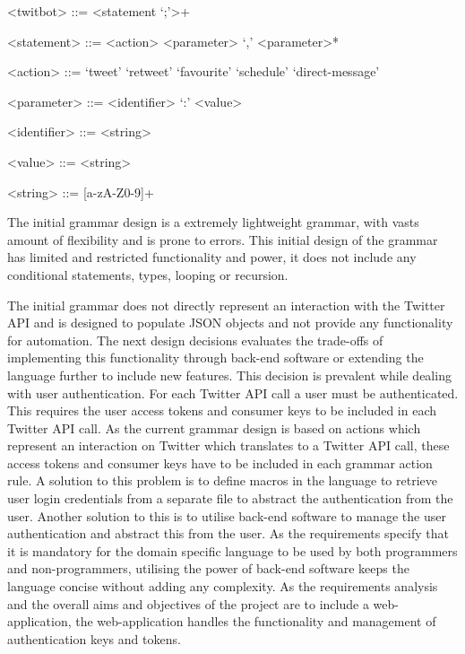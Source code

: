 \begin{grammar}
<twitbot> ::= <statement `;'>+

<statement> ::= <action> <parameter> `,' <parameter>*

<action> ::= `tweet' 
\alt `retweet'
\alt `favourite'
\alt `schedule'
\alt `direct-message'

<parameter> ::= <identifier> `:' <value>

<identifier> ::= <string>

<value> ::= <string>

<string> ::= [a-zA-Z0-9]+
\end{grammar}

The initial grammar design is a extremely lightweight grammar, with vasts amount of flexibility and is prone to errors. This initial design of the grammar has limited and restricted functionality and power, it does not include any conditional statements, types, looping or recursion. \newline \par

The initial grammar does not directly represent an interaction with the Twitter API and is designed to populate JSON objects and not provide any functionality for automation. The next design decisions evaluates the trade-offs of implementing this functionality through back-end software or extending the language further to include new features. This decision is prevalent while dealing with user authentication. For each Twitter API call a user must be authenticated. This requires the user access tokens and consumer keys to be included in each Twitter API call. As the current grammar design is based on actions which represent an interaction on Twitter which translates to a Twitter API call, these access tokens and consumer keys have to be included in each grammar action rule. A solution to this problem is to define macros in the language to retrieve user login credentials from a separate file to abstract the authentication from the user. Another solution to this is to utilise back-end software to manage the user authentication and abstract this from the user. As the requirements specify that it is mandatory for the domain specific language to be used by both programmers and non-programmers, utilising the power of back-end software keeps the language concise without adding any complexity. As the requirements analysis and the overall aims and objectives of the project are to include a web-application, the web-application handles the functionality and management of authentication keys and tokens. \newline \par

